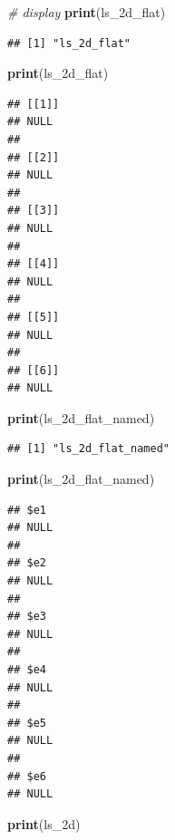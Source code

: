 \documentclass[
]{book}
\newenvironment{Shaded}{\begin{snugshade}}{\end{snugshade}}
\newcommand{\CommentTok}[1]{\textcolor[rgb]{0.56,0.35,0.01}{\textit{#1}}}
\newcommand{\KeywordTok}[1]{\textcolor[rgb]{0.13,0.29,0.53}{\textbf{#1}}}
\newcommand{\NormalTok}[1]{#1}
\newcommand{\StringTok}[1]{\textcolor[rgb]{0.31,0.60,0.02}{#1}}
\begin{document}
\begin{Shaded}
\begin{Highlighting}[]
\CommentTok{\# display}
\KeywordTok{print}\NormalTok{(}\StringTok{\textquotesingle{}ls\_2d\_flat\textquotesingle{}}\NormalTok{)}
\end{Highlighting}
\end{Shaded}

\begin{verbatim}
## [1] "ls_2d_flat"
\end{verbatim}

\begin{Shaded}
\begin{Highlighting}[]
\KeywordTok{print}\NormalTok{(ls\_2d\_flat)}
\end{Highlighting}
\end{Shaded}

\begin{verbatim}
## [[1]]
## NULL
## 
## [[2]]
## NULL
## 
## [[3]]
## NULL
## 
## [[4]]
## NULL
## 
## [[5]]
## NULL
## 
## [[6]]
## NULL
\end{verbatim}

\begin{Shaded}
\begin{Highlighting}[]
\KeywordTok{print}\NormalTok{(}\StringTok{\textquotesingle{}ls\_2d\_flat\_named\textquotesingle{}}\NormalTok{)}
\end{Highlighting}
\end{Shaded}

\begin{verbatim}
## [1] "ls_2d_flat_named"
\end{verbatim}

\begin{Shaded}
\begin{Highlighting}[]
\KeywordTok{print}\NormalTok{(ls\_2d\_flat\_named)}
\end{Highlighting}
\end{Shaded}

\begin{verbatim}
## $e1
## NULL
## 
## $e2
## NULL
## 
## $e3
## NULL
## 
## $e4
## NULL
## 
## $e5
## NULL
## 
## $e6
## NULL
\end{verbatim}

\begin{Shaded}
\begin{Highlighting}[]
\KeywordTok{print}\NormalTok{(}\StringTok{\textquotesingle{}ls\_2d\textquotesingle{}}\NormalTok{)}
\end{Highlighting}
\end{Shaded}
\end{document}
